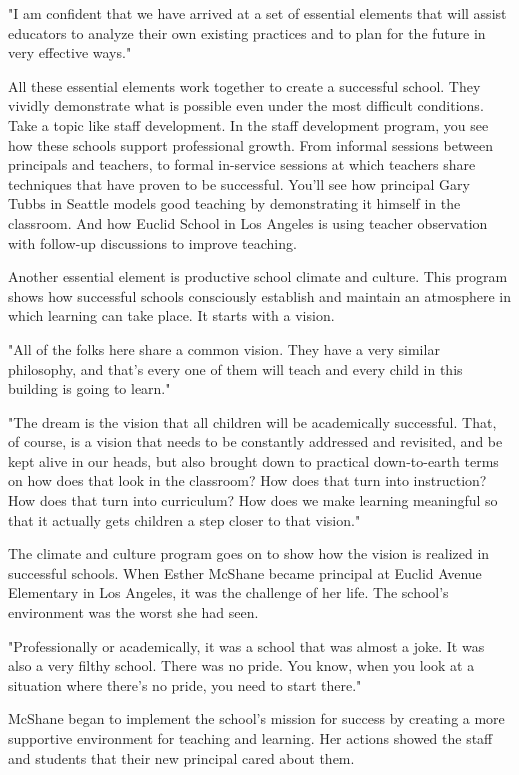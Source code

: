 "I am confident that we have arrived at a set of essential elements that will assist educators to analyze their own existing practices and to plan for the future in very effective ways."

All these essential elements work together to create a successful school.
They vividly demonstrate what is possible even under the most difficult conditions.
Take a topic like staff development.
In the staff development program, you see how these schools support professional growth.
From informal sessions between principals and teachers, to formal in-service sessions at which teachers share techniques that have proven to be successful.
You'll see how principal Gary Tubbs in Seattle models good teaching by demonstrating it himself in the classroom.
And how Euclid School in Los Angeles is using teacher observation with follow-up discussions to improve teaching.

Another essential element is productive school climate and culture.
This program shows how successful schools consciously establish and maintain an atmosphere in which learning can take place.
It starts with a vision.

"All of the folks here share a common vision.
They have a very similar philosophy, and that's every one of them will teach and every child in this building is going to learn."

"The dream is the vision that all children will be academically successful.
That, of course, is a vision that needs to be constantly addressed and revisited, and be kept alive in our heads, but also brought down to practical down-to-earth terms on how does that look in the classroom?
How does that turn into instruction?
How does that turn into curriculum?
How does we make learning meaningful so that it actually gets children a step closer to that vision."

The climate and culture program goes on to show how the vision is realized in successful schools.
When Esther McShane became principal at Euclid Avenue Elementary in Los Angeles, it was the challenge of her life.
The school's environment was the worst she had seen.

"Professionally or academically, it was a school that was almost a joke.
It was also a very filthy school.
There was no pride.
You know, when you look at a situation where there's no pride, you need to start there."

McShane began to implement the school's mission for success by creating a more supportive environment for teaching and learning.
Her actions showed the staff and students that their new principal cared about them.

